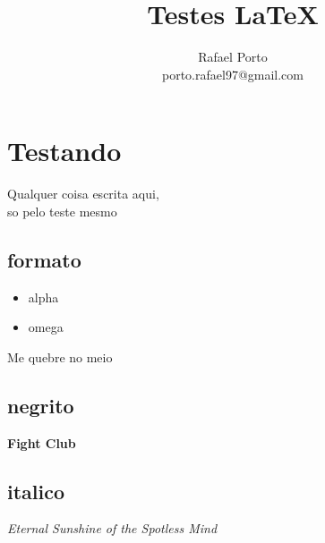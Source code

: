 \documentclass[12pt]{article}
\title{Testes \LaTeX}
\author{Rafael Porto \\ porto.rafael97@gmail.com}
\begin{document}
\chapter{Testando}
Qualquer coisa escrita aqui, \\ so pelo teste mesmo 

\section{formato}
\begin{itemize}
\item alpha
\item omega
\end{itemize}

Me quebre \newline no meio

\section{negrito}
\textbf{Fight Club}

\section{italico}
\textit{Eternal Sunshine of the Spotless Mind}
\end{document}
